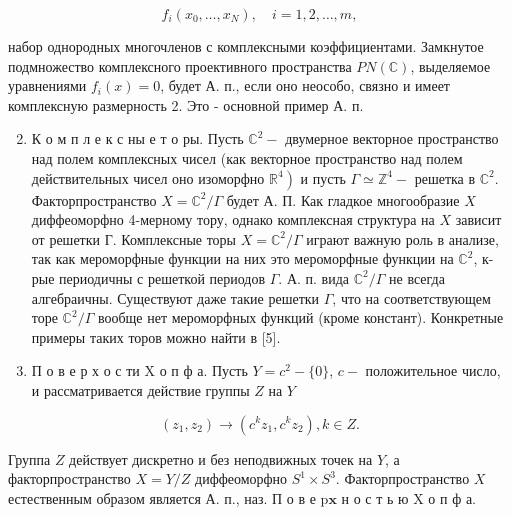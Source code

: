 \documentclass[10pt]{article}
\begin{document}
\[

f_{i}\left(x_{0}, \ldots, x_{N}\right), \quad i=1,2, \ldots, m,

\]



набор однородных многочленов с комплексными коэффициентами. Замкнутое подмножество комплексного проективного пространства $P N(\mathbb{C})$, выделяемое уравнениями $f_{i}(x)=0$, будет А. п., если оно неособо, связно и имеет комплексную размерность 2. Это - основной пример А. п.



\begin{enumerate}

  \setcounter{enumi}{1}

  \item К о м п л е к с ны е т о ры. Пусть $\mathbb{C}^{2}-$ двумерное векторное пространство над полем комплексных чисел (как векторное пространство над полем действительных чисел оно изоморфно $\left.\mathbb{R}^{4}\right)$ и пусть $\Gamma \simeq \mathbb{Z}^{4}-$ решетка в $\mathbb{C}^{2}$. Факторпространство $X=\mathbb{C}^{2} / \Gamma$ будет А. П. Как гладкое многообразие $X$ диффеоморфно 4-мерному тору, однако комплексная структура на $X$ зависит от решетки Г. Комплексные торы $X=\mathbb{C}^{2} / \Gamma$ играют важную роль в анализе, так как мероморфные функции на них это мероморфные функции на $\mathbb{C}^{2}$, к-рые периодичны с решеткой периодов $\Gamma$. А. п. вида $\mathbb{C}^{2} / \Gamma$ не всегда алгебраичны. Существуют даже такие решетки $\Gamma$, что на соответствующем торе $\mathbb{C}^{2} / \Gamma$ вообще нет мероморфных функций (кроме констант). Конкретные примеры таких торов можно найти в [5].



  \item П о в е р х о с ти $\mathrm{X}$ о п ф а. Пусть $Y=c^{2}-\{0\}$, $c-$ положительное число, и рассматривается действие группы $Z$ на $Y$



\end{enumerate}



\[

\left(z_{1}, z_{2}\right) \longrightarrow\left(c^{k} z_{1}, c^{k} z_{2}\right), k \in Z .

\]



Группа $Z$ действует дискретно и без неподвижных точек на $Y$, а факторпространство $X=Y / Z$ диффеоморфно $S^{1} \times S^{3}$. Факторпространство $X$ естественным образом является А. п., наз. П о в е $\mathrm{p} \mathbf{x}$ н о с т ь ю $\mathrm{X}$ о п ф а.
\end{document}

